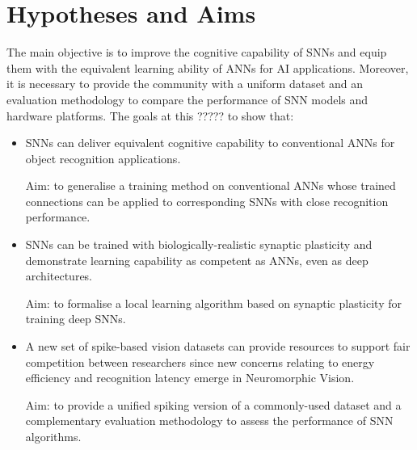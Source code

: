 \section{Hypotheses and Aims}
\label{sec:aim}
The main objective is to improve the cognitive capability of SNNs and equip them with the equivalent learning ability of ANNs for AI applications.
Moreover, it is necessary to provide the community with a uniform dataset and an evaluation methodology to compare the performance of SNN models and hardware platforms.
The goals at this ????? to show that:
\begin{itemize}
%

	\item 
	SNNs can deliver equivalent cognitive capability to conventional ANNs for object recognition applications.

	Aim: to generalise a training method on conventional ANNs whose trained connections can be applied to corresponding SNNs with close recognition performance.

	\item 
	SNNs can be trained with biologically-realistic synaptic plasticity and demonstrate learning capability as competent as ANNs, even as deep architectures.

	Aim: to formalise a local learning algorithm based on synaptic plasticity for training deep SNNs.

	\item 
	A new set of spike-based vision datasets can provide resources to support fair competition between researchers since new concerns relating to energy efficiency and recognition latency emerge in Neuromorphic Vision.

	Aim: to provide a unified spiking version of a commonly-used dataset and a complementary evaluation methodology to assess the performance of SNN algorithms.
\end{itemize}


